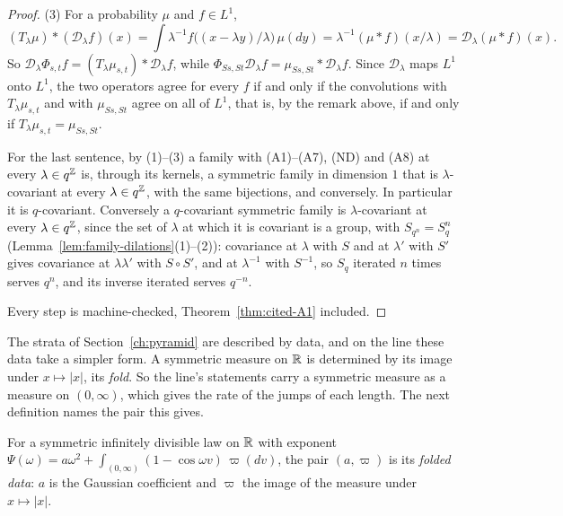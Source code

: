 \begin{proof}
(3) For a probability $\mu$ and $f \in L^1$,
\[
  (T_\lambda\mu) * (\mathcal{D}_\lambda f)(x) = \int\lambda^{-1}f\bigl((x - \lambda y)/\lambda\bigr)\,\mu(dy)
  = \lambda^{-1}(\mu * f)(x/\lambda) = \mathcal{D}_\lambda(\mu * f)(x) .
\]
So $\mathcal{D}_\lambda\Phi_{s,t}f = (T_\lambda\mu_{s,t}) * \mathcal{D}_\lambda f$, while
$\Phi_{Ss,St}\mathcal{D}_\lambda f = \mu_{Ss,St} * \mathcal{D}_\lambda f$. Since
$\mathcal{D}_\lambda$ maps $L^1$ onto $L^1$, the two operators agree for every $f$ if and only if
the convolutions with $T_\lambda\mu_{s,t}$ and with $\mu_{Ss,St}$ agree on all of $L^1$, that is,
by the remark above, if and only if $T_\lambda\mu_{s,t} = \mu_{Ss,St}$.

For the last sentence, by (1)--(3) a family with (A1)--(A7), (ND) and (A8) at every
$\lambda \in q^{\mathbb{Z}}$ is, through its kernels, a symmetric family in dimension $1$ that is
$\lambda$-covariant at every $\lambda \in q^{\mathbb{Z}}$, with the same bijections, and conversely. In
particular it is $q$-covariant. Conversely a $q$-covariant symmetric family is
$\lambda$-covariant at every $\lambda \in q^{\mathbb{Z}}$, since the set of $\lambda$ at which it is
covariant is a group, with $S_{q^n} = S_q^n$ (Lemma~\ref{lem:family-dilations}(1)--(2)):
covariance at $\lambda$ with $S$ and at $\lambda'$ with $S'$ gives covariance at $\lambda\lambda'$
with $S \circ S'$, and at $\lambda^{-1}$ with $S^{-1}$, so $S_q$ iterated $n$ times serves $q^n$,
and its inverse iterated serves $q^{-n}$.

Every step is machine-checked, Theorem~\ref{thm:cited-A1} included.
\end{proof}

The strata of Section~\ref{ch:pyramid} are described by \Levy{} data, and on the line these data
take a simpler form. A symmetric measure on $\mathbb{R}$ is determined by its image under
$x \mapsto |x|$, its \emph{fold}. So the line's statements carry a symmetric \Levy{} measure as a
measure on $(0,\infty)$, which gives the rate of the jumps of each length. The next definition names
the pair this gives.

\begin{definition}
\label{def:folded-data}

For a symmetric infinitely divisible law on $\mathbb{R}$ with exponent
$\Psi(\omega) = a\omega^2 + \int_{(0,\infty)}(1 - \cos\omega v)\,\varpi(dv)$, the pair
$(a, \varpi)$ is its \emph{folded data}: $a$ is the Gaussian coefficient and $\varpi$ the image
of the \Levy{} measure under $x \mapsto |x|$.
\end{definition}

